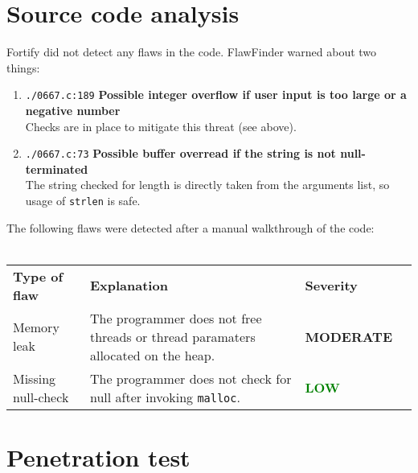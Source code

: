 \documentclass[11pt,twoside]{article}
\begin{document}
\section{Source code analysis}
Fortify did not detect any flaws in the code. FlawFinder warned about two things:
\begin{enumerate}
    \item \verb!./0667.c:189! \textbf{Possible integer overflow if user input is too large or a negative number} \\Checks are in place to mitigate this threat (see above).
    \item \verb!./0667.c:73! \textbf{Possible buffer overread if the string is not null-terminated} \\The string checked for length is directly taken from the
    arguments list, so usage of \verb!strlen! is safe.
\end{enumerate}

\noindent
The following flaws were detected after a manual walkthrough of the code:
\\\\
\begin{tabular}{ l | p{8cm}l | l }
  \textbf{Type of flaw} & \textbf{Explanation} & \textbf{Severity} \\
  Memory leak & The programmer does not free threads or thread paramaters allocated on the heap. & \textbf{\textcolor{BurntOrange}{MODERATE}} \\
  Missing null-check & The programmer does not check for null after invoking \verb!malloc!. & \textbf{\textcolor{green}{LOW}}
\end{tabular}

\section{Penetration test}
\end{document}
